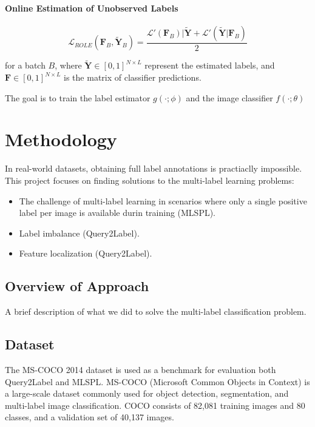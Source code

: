 \documentclass[lettersize,journal]{IEEEtran}
\begin{document}
\paragraph{Online Estimation of Unobserved Labels}

\begin{equation}
    \mathcal{L}_{ROLE}(\bm{F}_B, \bm{\tilde{Y}}_B) = \frac{\mathcal{L}'(\bm{F}_B)|\bm{\tilde{Y}}+\mathcal{L}'(\bm{\tilde{Y}}|\bm{F}_B)}{2}
\end{equation}

for a batch $B$, where $\bm{\tilde{Y}}\in[0,1]^{N\times L}$ represent the estimated labels, and $\bm{F}\in[0,1]^{N\times L}$ is the matrix of classifier predictions.

The goal is to train the label estimator $g(\cdot;\phi)$ and the image classifier $f(\cdot;\theta)$


\section{Methodology}

In real-world datasets, obtaining full label annotations is practiaclly impossible.
This project focuses on finding solutions to the multi-label learning problems:
\begin{itemize} 
    \item  The challenge of multi-label learning in scenarios where only a single positive label per image is available durin training (MLSPL).
    \item Label imbalance (Query2Label).
    \item Feature localization (Query2Label).
\end{itemize}

\subsection{Overview of Approach}
A brief description of what we did to solve the multi-label classification problem. 

\subsection{Dataset}
The MS-COCO 2014 \cite{coco14} dataset is used as a benchmark for evaluation both Query2Label and MLSPL. MS-COCO (Microsoft Common Objects in Context) is a large-scale dataset commonly used for object detection, segmentation, and multi-label image classification. COCO consists of 82,081 training images and 80 classes, and a validation set of 40,137 images.
\end{document}
